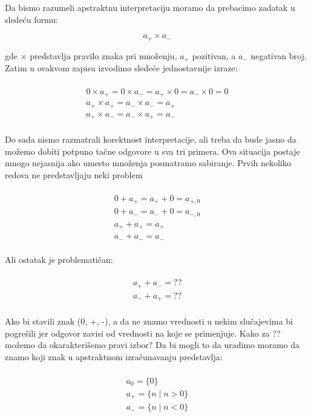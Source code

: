Da bismo razumeli apstraktnu interpretaciju moramo da prebacimo zadatak u sledeću formu:

\begin{equation}
  a_{+} \times a_{-}
\end{equation}

gde $\times$ predstavlja pravilo znaka pri množenju, $a_{+}$ pozitivan, a $a_{-}$ negativan broj. Zatim u ovakvom zapisu izvodimo sledeće jednostavnije izraze:

\begin{multline} \\
  	0 \times a_{+} = 0 \times a_{-} = a_{+} \times 0 = a_{-} \times 0 = 0 \\
  	a_{+} \times a_{+} = a_{-} \times a_{-} = a_{+} \\
  	a_{+} \times a_{-} = a_{-} \times a_{+} = a_{-} \\
\end{multline}

Do sada nismo razmatrali korektnost interpretacije, ali treba da bude jasno da možemo dobiti potpuno tačne odgovore u sva tri primera. Ova situacija postaje mnogo nejasnija ako umesto množenja posmatramo sabiranje. Prvih nekoliko redova ne pred\-stavljaju neki problem 

\begin{multline} \\
	0 + a_{+} = a_{+} + 0 = a_{+,0} \\ 
	0 + a_{-} = a_{-} + 0 = a_{-,0} \\ 
	a_{+} + a_{+} = a_{+}  \\ 
	a_{-} + a_{-} = a_{-}  \\ 
\end{multline}


Ali ostatak je problematičan:

\begin{multline}	\\
	a_{+} + a_{-} = ?? \\ 
	a_{-} + a_{+} = ?? \\ 
\end{multline}

Ako bi stavili znak (0, +, -), a da ne znamo vrednosti u nekim slu\-čajevima bi pogrešili jer odgovor zavisi od vrednosti na koje se primenjuje. Kako za ?? možemo da okarakterišemo pravi izbor? Da bi mogli to da uradimo moramo da znamo koji znak u apstraktnom izračunavanju predstavlja:

\begin{multline}	\\
	a_{0} = \{0\}				\\    
	a_{+} = \{n \mid n > 0\}		\\	
	a_{-} = \{n \mid n < 0\}		\\
\end{multline}

